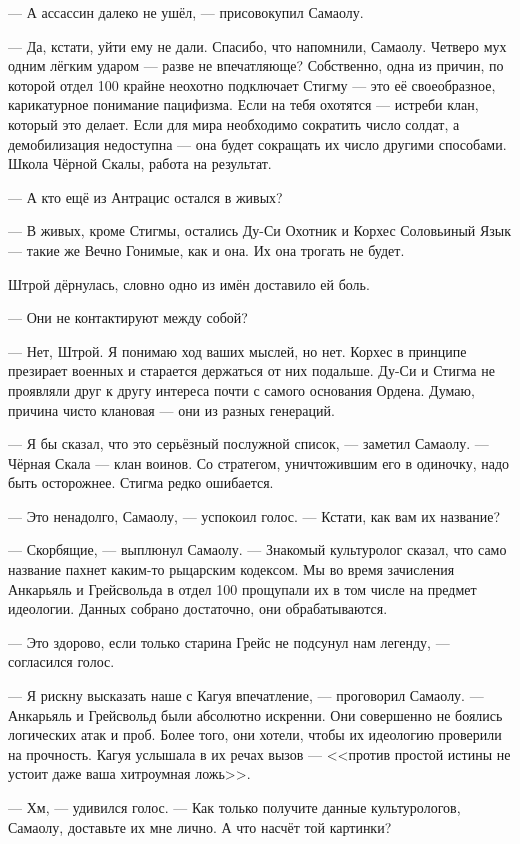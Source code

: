 --- А ассассин далеко не ушёл, --- присовокупил Самаолу.

--- Да, кстати, уйти ему не дали.
Спасибо, что напомнили, Самаолу.
Четверо мух одним лёгким ударом --- разве не впечатляюще?
Собственно, одна из причин, по которой отдел 100 крайне неохотно подключает Стигму --- это её своеобразное, карикатурное понимание пацифизма.
Если на тебя охотятся --- истреби клан, который это делает.
Если для мира необходимо сократить число солдат, а демобилизация недоступна --- она будет сокращать их число другими способами.
Школа Чёрной Скалы, работа на результат.

--- А кто ещё из Антрацис остался в живых?

--- В живых, кроме Стигмы, остались Ду-Си Охотник и Корхес Соловьиный Язык --- такие же Вечно Гонимые, как и она.
Их она трогать не будет.

Штрой дёрнулась, словно одно из имён доставило ей боль.

--- Они не контактируют между собой?

--- Нет, Штрой.
Я понимаю ход ваших мыслей, но нет.
Корхес в принципе презирает военных и старается держаться от них подальше.
Ду-Си и Стигма не проявляли друг к другу интереса почти с самого основания Ордена.
Думаю, причина чисто клановая --- они из разных генераций.

--- Я бы сказал, что это серьёзный послужной список, --- заметил Самаолу.
--- Чёрная Скала --- клан воинов.
Со стратегом, уничтожившим его в одиночку, надо быть осторожнее.
Стигма редко ошибается.

--- Это ненадолго, Самаолу, --- успокоил голос.
--- Кстати, как вам их название?

--- Скорбящие, --- выплюнул Самаолу.
--- Знакомый культуролог сказал, что само название пахнет каким-то рыцарским кодексом.
Мы во время зачисления Анкарьяль и Грейсвольда в отдел 100 прощупали их в том числе на предмет идеологии.
Данных собрано достаточно, они обрабатываются.

--- Это здорово, если только старина Грейс не подсунул нам легенду, --- согласился голос.

--- Я рискну высказать наше с Кагуя впечатление, --- проговорил Самаолу.
--- Анкарьяль и Грейсвольд были абсолютно искренни.
Они совершенно не боялись логических атак и проб.
Более того, они хотели, чтобы их идеологию проверили на прочность.
Кагуя услышала в их речах вызов --- <<против простой истины не устоит даже ваша хитроумная ложь>>.

--- Хм, --- удивился голос.
--- Как только получите данные культурологов, Самаолу, доставьте их мне лично.
А что насчёт той картинки?

